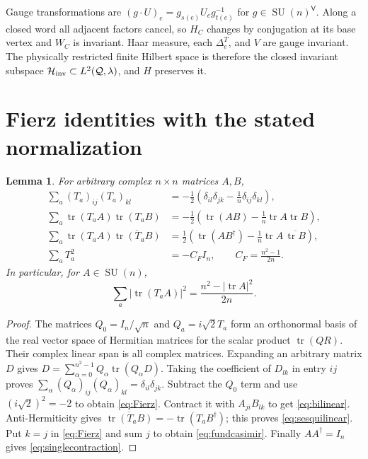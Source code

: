 \documentclass[11pt]{article}
\newtheorem{lemma}[theorem]{Lemma}
\theoremstyle{definition}
\newcommand{\tr}{\operatorname{tr}}
\newcommand{\SU}{\operatorname{SU}}
\begin{document}
Gauge transformations are
$(g\cdot U)_e=g_{s(e)}U_eg_{t(e)}^{-1}$ for
$g\in\SU(n)^{\mathsf V}$. Along a closed word all adjacent factors cancel,
so $H_C$ changes by conjugation at its base vertex and $W_C$ is invariant.
Haar measure, each $\Delta_e^T$, and $V$ are gauge invariant. The physically
restricted finite Hilbert space is therefore the closed invariant subspace
$\mathcal H_{\rm inv}\subset L^2(\mathcal Q,\lambda)$, and $H$ preserves it.

\section{Fierz identities with the stated normalization}

\begin{lemma}\label{lem:Fierz}
For arbitrary complex $n\times n$ matrices $A,B$,
\begin{align}
 \sum_a(T_a)_{ij}(T_a)_{kl}
 &=-\frac12\left(\delta_{il}\delta_{jk}
                  -\frac1n\delta_{ij}\delta_{kl}\right),\label{eq:Fierz}\\
 \sum_a\tr(T_aA)\tr(T_aB)
 &=-\frac12\left(\tr(AB)-\frac1n\tr A\tr B\right),\label{eq:bilinear}\\
 \sum_a\tr(T_aA)\overline{\tr(T_aB)}
 &=\frac12\left(\tr(AB^\dagger)
       -\frac1n\tr A\,\overline{\tr B}\right),\label{eq:sesquilinear}\\
 \sum_aT_a^2&=-C_FI_n,\qquad C_F=\frac{n^2-1}{2n}.\label{eq:fundcasimir}
\end{align}
In particular, for $A\in\SU(n)$,
\begin{equation}\label{eq:singlecontraction}
 \sum_a|\tr(T_aA)|^2=\frac{n^2-|\tr A|^2}{2n}.
\end{equation}
\end{lemma}
\begin{proof}
The matrices $Q_0=I_n/\sqrt n$ and $Q_a=i\sqrt2T_a$ form an orthonormal
basis of the real vector space of Hermitian matrices for the scalar product
$\tr(QR)$. Their complex linear span is all complex matrices. Expanding an
arbitrary matrix $D$ gives
$D=\sum_{\alpha=0}^{n^2-1}Q_\alpha\tr(Q_\alpha D)$.
Taking the coefficient of $D_{lk}$ in entry $ij$ proves
$\sum_\alpha(Q_\alpha)_{ij}(Q_\alpha)_{kl}=\delta_{il}\delta_{jk}$.
Subtract the $Q_0$ term and use $(i\sqrt2)^2=-2$ to obtain
\eqref{eq:Fierz}. Contract it with $A_{ji}B_{lk}$ to get
\eqref{eq:bilinear}. Anti-Hermiticity gives
$\overline{\tr(T_aB)}=-\tr(T_aB^\dagger)$; this proves
\eqref{eq:sesquilinear}. Put $k=j$ in \eqref{eq:Fierz} and sum $j$ to
obtain \eqref{eq:fundcasimir}. Finally $AA^\dagger=I_n$ gives
\eqref{eq:singlecontraction}.
\end{proof}
\end{document}
